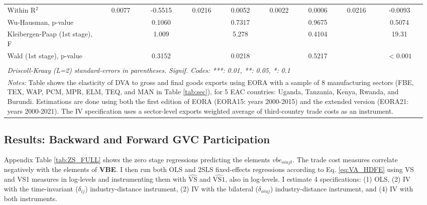 \documentclass[a4paper]{article}
\begin{document}
\begin{table}[h!]
{\begin{tabular}{lcccccccc}
      Within R$^2$                        & 0.0077         & -0.5515     & 0.0216         & 0.0052      & 0.0022       & 0.0006      & 0.0216         & -0.0093\\  
      Wu-Hausman, p-value                 &                & 0.1060      &                & 0.7317      &              & 0.9675      &                & 0.5074\\  
      Kleibergen-Paap (1st stage), F &           & 1.009       &                & 5.278       &              & 0.4104      &                & 19.31\\ 
      Wald (1st stage), p-value   &                & 0.3152      &                & 0.0218             &                & 0.5217      &                & $<0.001$ \\  
      \bottomrule \\ [-0.9em]
      \multicolumn{9}{l}{\emph{Driscoll-Kraay (L=2) standard-errors in parentheses. Signif. Codes: ***: 0.01, **: 0.05, *: 0.1}}\\
       \multicolumn{9}{l}{\parbox{1.25\textwidth}{\scriptsize
\textit{Notes:} Table shows the elasticity of DVA to gross and final goods exports using EORA with a sample of 8 manufacturing sectors (FBE, TEX, WAP, PCM, MPR, ELM, TEQ, and MAN in Table \ref{tab:sec}), for 5 EAC countries: Uganda, Tanzania, Kenya, Rwanda, and Burundi. Estimations are done using both the first edition of EORA (EORA15: years 2000-2015) and the extended version (EORA21: years 2000-2021). The IV specification uses a sector-level exports weighted average of third-country trade costs as an instrument.  }}
   \end{tabular}
   }
\end{table}



\subsection{Results: Backward and Forward GVC Participation}

Appendix Table \ref{tab:ZS_FULL} shows the zero stage regressions predicting the elements $vbe_{oiujt}$. The trade cost measures correlate negatively with the elements of \textbf{VBE}. I then run both OLS and 2SLS fixed-effects regressions according to Eq. \ref{eq:VA_HDFE} using VS and VS1 measures in log-levels and instrumenting them with $\hat{\text{VS}}$ and $\hat{\text{VS1}}$, also in log-levels. I estimate 4 specifications: (1) OLS, (2) IV with the time-invariant ($\delta_{ij}$) industry-distance instrument,  (2) IV with the bilateral ($\delta_{oiuj}$) industry-distance instrument, and (4) IV with both instruments. \newline
\end{document}
